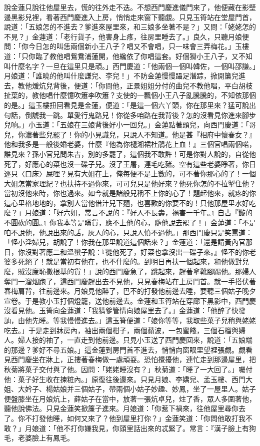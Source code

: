 \begin{showcontents}{}
說金蓮只說往他屋里去，慌的往外走不迭。不想西門慶進儀門來了，他便藏在影壁邊黑影兒裡，看著西門慶進入上房，悄悄走來窗下聽覷。只見玉筲站在堂屋門首，說道：「五娘怎的不進去？爹進來屋里來，和三娘多坐著不是？」又問：「姥姥怎的不見？」金蓮道：「老行貨子，他害身上疼，往房里睡去了。」良久，只聽月娘便問：「你今日怎的叫恁兩個新小王八子？唱又不會唱，只一味會三弄梅花。」玉樓道：「只你臨了教他唱鴛鴦浦蓮開，他纔依了你唱這套。好個猾小王八子，又不知叫什麼名字？一旦在這里只是頑。」西門慶道：「他兩個一個叫韓佐，一個叫邵謙。」月娘道：「誰曉的他叫什麼謙兒、李兒！」不防金蓮慢慢躡足潛踪，掀開簾兒進去，教他煖炕兒背後，便道：「你問他，正景姐姐分付的曲兒不教他唱，平白胡枝扯葉的，教他唱什麼憶吹簫李吹簫？支使的一飄個小王八子亂騰騰的，不知依那個的是。」這玉樓扭回看見是金蓮，便道：「是這一個六丫頭，你在那里來？猛可說出句話，倒諕我一跳。單愛行鬼路兒！你從多咱路在我背後？怎的沒看見你進來腳步兒响。」小玉道：「五娘在三娘背後好小一回兒。」金蓮點著頭兒，向西門慶道：「哥兒，你濃著些兒罷了！你的小見識兒，只說人不知道。他是甚『相府中懷春女？』他和我多是一般後婚老婆，什麼『他為你褪湘裙杜鵑花上血！』三個官唱兩個喏，誰見來？孫小官兒問朱吉，別的多罷了，這個我不敢許！可是你對人說的，自從他死了，好應心的菜也沒一碟子兒。沒了王屠，連毛吃豬。空有這些老婆睜著，你日逐只〈口床〉屎哩？見有大姐在上，俺每便不是上數的，可不著你那心的了！一個大姐怎當家理紀？也扶持不過你來，可可兒只是他好來？他死你怎的不拉掣住他？當初沒他來時，你也過來。如今就是諸般兒稱不上你的心了！題起他來，就疼的你這心里格地地的，拿別人當他借汁兒下麵，也喜歡的你要不的！只他那屋里水好吃麼？」月娘道：「好六姐，常言不說的：『好人不長壽，禍害一千年。』自古『鏇的不圓砍的圓。』你我本等是瞞貨，應不上他的心，隨他說去罷了！」金蓮道：「不是咱不說他，他說出來的話，灰人的心，只說人憤不過他。」那西門慶只是笑罵道：「怪小淫婦兒，胡說了！你我在那里說道這個話來？」金蓮道：「還是請黃內官那日，你沒對著應二和溫蠻子說：『從他死了，好菜也拿沒出一碟子來。』怪不的你老婆多死絕了！就是當初有他在，也不什麼的。到明日再扶一個起來，和他做對兒麼，賊沒廉恥撒根基的貨！」說的西門慶急了，跳起來，趕著拿靴腳踢他。那婦人奪門一溜烟跑了，這西門慶趕出去不見他，只見春梅站在上房門首。就一手搭伏著春梅肩背，往前邊來。月娘見他醉了，巴不的打發他前邊去睡，要聽三個姑子晚夕宣卷。于是教小玉打個燈籠，送他前邊去。金蓮和玉筲站在穿廊下黑影中，西門慶沒看見他。玉筲向金蓮道：「我猜爹管情向娘屋里去了。」金蓮道：「他醉了快發訕，由他先睡。等我慢慢進去。」這玉筲便道：「娘你等等，我取些菓子兒稍與姥姥吃去。」于是走到牀房內，袖出兩個柑子，兩個蘋波，一包蜜餞，三個石榴與婦人。婦人接的袖了，一直走到他前邊。只見小玉送了西門慶回來，說道：「五娘端的那邊？爹好不尋五娘。」這金蓮到房門首不進去，悄悄向窗眼里望裡張覷。覷看見西門慶坐在牀上，正摟著春梅做一處頑耍。恐怕攪擾他，連忙走到那邊屋里，把秋菊將菓子交付與了他。因問：「姥姥睡沒有？」秋菊道：「睡了一大回了。」囑付他：菓子好生收在揀粧內。」原復往後邊來。只見月娘、李嬌兒、孟玉樓、西門大姐、大妗子、楊姑娘并三個姑子，帶兩個小姑子妙趣、妙鳳，坐了一屋里人。姑子便盤膝坐在月娘炕上，薛姑子在當中，放著一張炕卓兒，炷了香，眾人多圍著他，聽他說佛法。只見金蓮笑掀簾子進來。月娘道：「你惹下禍來，往他屋里尋你去了。你不打發他睡，如何又來了？他到屋里打你？」金蓮笑道：「你問他敢打我不敢？」月娘道：「他不打你嫌我見，你頭里話出來的忒緊了。常言：『漢子臉上有狗毛，老婆臉上有鳳毛。
\end{showcontents}
